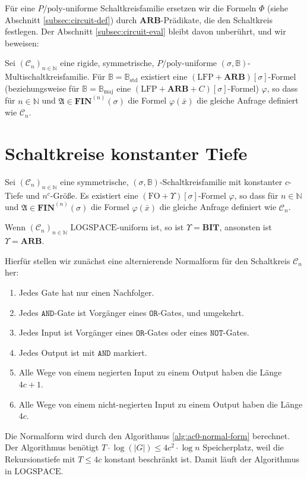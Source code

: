 Für eine $P/\mathrm{poly}$-uniforme Schaltkreisfamilie ersetzen wir
die Formeln $\Phi$ (siehe Abschnitt \ref{subsec:circuit-def}) durch
$\mathbf{ARB}$-Prädikate, die den Schaltkreis festlegen. Der Abschnitt
\ref{subsec:circuit-eval} bleibt davon unberührt, und wir beweisen:
\begin{lem}
Sei $\left(\mathcal{C}_{n}\right)_{n\in\mathbb{N}}$ eine rigide,
symmetrische, $P/\mathrm{poly}$-uniforme $\left(\sigma,\mathbb{B}\right)$-Multischaltkreisfamilie.
Für $\mathbb{B}=\mathbb{B}_{\mathrm{std}}$ existiert eine $\left(\mathrm{LFP}+\mathbf{ARB}\right)\left[\sigma\right]$-Formel
(beziehungsweise für $\mathbb{B}=\mathbb{B}_{\mathrm{maj}}$ eine
$\left(\mathrm{LFP}+\mathbf{ARB}+C\right)\left[\sigma\right]$-Formel)
$\varphi$, so dass für $n\in\mathbb{N}$ und $\mathfrak{A}\in\mathbf{FIN}^{\left(n\right)}\left(\sigma\right)$
die Formel $\varphi\left(\bar{x}\right)$ die gleiche Anfrage definiert
wie $\mathcal{C}_{n}$.
\end{lem}

\section{Schaltkreise konstanter Tiefe}
\begin{lem}
\label{lem:ac0-fo}Sei $\left(\mathcal{C}_{n}\right)_{n\in\mathbb{N}}$
eine symmetrische, $\left(\sigma,\mathbb{B}\right)$-Schaltkreisfamilie
mit konstanter $c$-Tiefe und $n^{c}$-Größe. Es existiert eine $\left(\mathrm{FO}+\Upsilon\right)\left[\sigma\right]$-Formel
$\varphi$, so dass für $n\in\mathbb{N}$ und $\mathfrak{A}\in\mathbf{FIN}^{\left(n\right)}\left(\sigma\right)$
die Formel $\varphi\left(\bar{x}\right)$ die gleiche Anfrage definiert
wie $\mathcal{C}_{n}$.

Wenn $\left(\mathcal{C}_{n}\right)_{n\in\mathbb{N}}$ $\mathrm{LOGSPACE}$-uniform
ist, so ist $\Upsilon=\mathbf{BIT}$, ansonsten ist $\Upsilon=\mathbf{ARB}$.
\end{lem}
Hierfür stellen wir zunächst eine alternierende Normalform für den
Schaltkreis $\mathcal{C}_{n}$ her:
\begin{enumerate}
\item Jedes Gate hat nur einen Nachfolger.
\item Jedes $\mathtt{AND}$-Gate ist Vorgänger eines $\mathtt{OR}$-Gates,
und umgekehrt.
\item Jedes Input ist Vorgänger eines $\mathtt{OR}$-Gates oder eines $\mathtt{NOT}$-Gates.
\item Jedes Output ist mit $\mathtt{AND}$ markiert.
\item Alle Wege von einem negierten Input zu einem Output haben die Länge
$4c+1$.
\item Alle Wege von einem nicht-negierten Input zu einem Output haben die
Länge $4c$.
\end{enumerate}
Die Normalform wird durch den Algorithmus \ref{alg:ac0-normal-form}
berechnet. Der Algorithmus benötigt $T\cdot\log\left(\left|G\right|\right)\leqslant4c^{2}\cdot\log n$
Speicherplatz, weil die Rekursionstiefe mit $T\leqslant4c$ konstant
beschränkt ist. Damit läuft der Algorithmus in $\mathrm{LOGSPACE}$.

